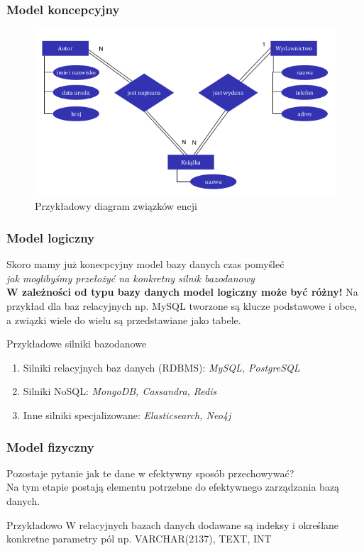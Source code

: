 \documentclass{beamer}
\begin{document}
\begin{frame}
    \frametitle{Model koncepcyjny}
    \begin{figure}
        \includegraphics[width=1\textwidth]{erd.png}
        \caption{Przykładowy diagram związków encji}
    \end{figure}
\end{frame}

\begin{frame}
    \frametitle{Model logiczny}
    Skoro mamy już konecpcyjny model bazy danych czas pomyśleć\\ 
    \textit{jak moglibyśmy przełożyć na konkretny silnik bazodanowy}\\
    \textbf{W zależności od typu bazy danych model logiczny może być różny!} 
    Na przykład dla baz relacyjnych np. MySQL tworzone są klucze podstawowe i obce, a związki wiele do wielu są przedstawiane jako tabele.
    \begin{block}{Przykładowe silniki bazodanowe}
        \begin{enumerate}
        \item Silniki relacyjnych baz danych (RDBMS): \textit{MySQL, PostgreSQL}
        \item Silniki NoSQL: \textit{MongoDB, Cassandra, Redis}
        \item Inne silniki specjalizowane: \textit{Elasticsearch, Neo4j}  
        \end{enumerate}
    \end{block}
\end{frame}

\begin{frame}
    \frametitle{Model fizyczny}
    Pozostaje pytanie jak te dane w efektywny sposób przechowywać?\\
    Na tym etapie postają elementu potrzebne do efektywnego zarządzania bazą danych.\\
    \begin{block}{Przykładowo}
    W relacyjnych bazach danych dodawane są indeksy i określane konkretne parametry pól np. VARCHAR(2137), TEXT, INT
    \end{block}

\end{frame}
\end{document}
